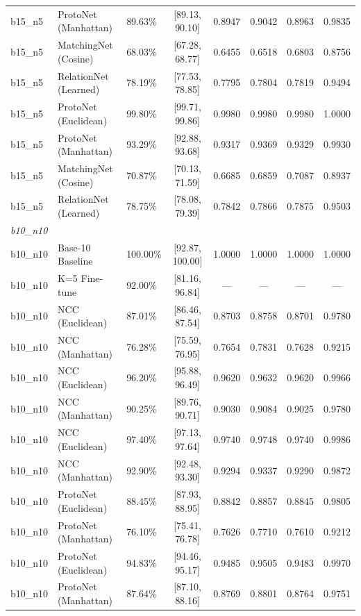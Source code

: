\begin{table}[htbp]
\begin{tabular}{lllccccc}
b15\_n5 & ProtoNet (Manhattan) & 89.63\% & [89.13, 90.10] & 0.8947 & 0.9042 & 0.8963 & 0.9835 \\
b15\_n5 & MatchingNet (Cosine) & 68.03\% & [67.28, 68.77] & 0.6455 & 0.6518 & 0.6803 & 0.8756 \\
b15\_n5 & RelationNet (Learned) & 78.19\% & [77.53, 78.85] & 0.7795 & 0.7804 & 0.7819 & 0.9494 \\
b15\_n5 & ProtoNet (Euclidean) & 99.80\% & [99.71, 99.86] & 0.9980 & 0.9980 & 0.9980 & 1.0000 \\
b15\_n5 & ProtoNet (Manhattan) & 93.29\% & [92.88, 93.68] & 0.9317 & 0.9369 & 0.9329 & 0.9930 \\
b15\_n5 & MatchingNet (Cosine) & 70.87\% & [70.13, 71.59] & 0.6685 & 0.6859 & 0.7087 & 0.8937 \\
b15\_n5 & RelationNet (Learned) & 78.75\% & [78.08, 79.39] & 0.7842 & 0.7866 & 0.7875 & 0.9503 \\
\hline
\multicolumn{8}{l}{\textit{b10\_n10}} \\
b10\_n10 & Base-10 Baseline & 100.00\% & [92.87, 100.00] & 1.0000 & 1.0000 & 1.0000 & 1.0000 \\
b10\_n10 & K=5 Fine-tune & 92.00\% & [81.16, 96.84] & --- & --- & --- & --- \\
b10\_n10 & NCC (Euclidean) & 87.01\% & [86.46, 87.54] & 0.8703 & 0.8758 & 0.8701 & 0.9780 \\
b10\_n10 & NCC (Manhattan) & 76.28\% & [75.59, 76.95] & 0.7654 & 0.7831 & 0.7628 & 0.9215 \\
b10\_n10 & NCC (Euclidean) & 96.20\% & [95.88, 96.49] & 0.9620 & 0.9632 & 0.9620 & 0.9966 \\
b10\_n10 & NCC (Manhattan) & 90.25\% & [89.76, 90.71] & 0.9030 & 0.9084 & 0.9025 & 0.9780 \\
b10\_n10 & NCC (Euclidean) & 97.40\% & [97.13, 97.64] & 0.9740 & 0.9748 & 0.9740 & 0.9986 \\
b10\_n10 & NCC (Manhattan) & 92.90\% & [92.48, 93.30] & 0.9294 & 0.9337 & 0.9290 & 0.9872 \\
b10\_n10 & ProtoNet (Euclidean) & 88.45\% & [87.93, 88.95] & 0.8842 & 0.8857 & 0.8845 & 0.9805 \\
b10\_n10 & ProtoNet (Manhattan) & 76.10\% & [75.41, 76.78] & 0.7626 & 0.7710 & 0.7610 & 0.9212 \\
b10\_n10 & ProtoNet (Euclidean) & 94.83\% & [94.46, 95.17] & 0.9485 & 0.9505 & 0.9483 & 0.9970 \\
b10\_n10 & ProtoNet (Manhattan) & 87.64\% & [87.10, 88.16] & 0.8769 & 0.8801 & 0.8764 & 0.9751 \\

\end{tabular}
\end{table}
